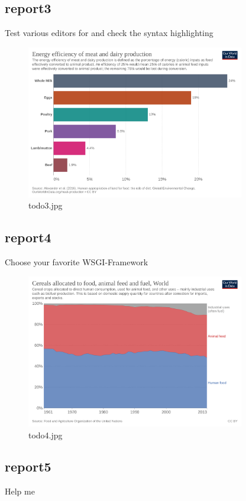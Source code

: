 \documentclass{article}%
\begin{document}
%
\FloatBarrier

%
\subsection{report3}%
\label{subsec:report3}%
Test various editors for and check the syntax highlighting%


\begin{figure}[! htb]%
\centering%
\includegraphics[width=360px]{todo3.jpg}%
\caption{todo3.jpg}%
\end{figure}

%
\FloatBarrier

%
\subsection{report4}%
\label{subsec:report4}%
Choose your favorite WSGI{-}Framework%


\begin{figure}[! htb]%
\centering%
\includegraphics[width=360px]{todo4.jpg}%
\caption{todo4.jpg}%
\end{figure}

%
\FloatBarrier

%
\subsection{report5}%
\label{subsec:report5}%
Help me%
\end{document}
